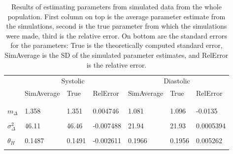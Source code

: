 \documentclass[
]{article}
\begin{document}
\begin{table}[!h]

\caption{\label{tab:testparameters}Results of estimating parameters from simulated data from the whole population. 
    First column on top is the average parameter estimate from the simulations, second is the true parameter from which the simulations were made, third is the relative error.
    On bottom are the standard errors for the parameters: True is the theoretically computed standard error, SimAverage is the SD of the simulated parameter estimates, and RelError is the relative error.}
\centering
\begin{tabular}[t]{lllllll}
\toprule
\multicolumn{1}{c}{ } & \multicolumn{3}{c}{Systolic} & \multicolumn{3}{c}{Diastolic} \\
\cmidrule(l{3pt}r{3pt}){2-4} \cmidrule(l{3pt}r{3pt}){5-7}
  & SimAverage & True & RelError & SimAverage & True & RelError\\
\midrule
\addlinespace[0.3em]
\multicolumn{7}{l}{\textbf{Parameter estimates}}\\
\cellcolor{gray!6}{\hspace{1em}$m_M$} & \cellcolor{gray!6}{123.4} & \cellcolor{gray!6}{123.3} & \cellcolor{gray!6}{0.0006065} & \cellcolor{gray!6}{72.34} & \cellcolor{gray!6}{72.31} & \cellcolor{gray!6}{0.0004937}\\
\hspace{1em}$m_\Delta$ & 1.358 & 1.351 & 0.004746 & 1.081 & 1.096 & -0.0135\\
\cellcolor{gray!6}{\hspace{1em}$\sigma^2_M$} & \cellcolor{gray!6}{376.1} & \cellcolor{gray!6}{376.7} & \cellcolor{gray!6}{-0.001494} & \cellcolor{gray!6}{104.1} & \cellcolor{gray!6}{104} & \cellcolor{gray!6}{0.00128}\\
\hspace{1em}$\sigma^2_\Delta$ & 46.11 & 46.46 & -0.007488 & 21.94 & 21.93 & 0.0005394\\
\cellcolor{gray!6}{\hspace{1em}$\alpha_H$} & \cellcolor{gray!6}{2.16} & \cellcolor{gray!6}{2.179} & \cellcolor{gray!6}{-0.008571} & \cellcolor{gray!6}{2.331} & \cellcolor{gray!6}{2.331} & \cellcolor{gray!6}{-4.281e-05}\\
\hspace{1em}$\theta_H$ & 0.1487 & 0.1491 & -0.002611 & 0.1966 & 0.1956 & 0.005262\\
\cellcolor{gray!6}{\hspace{1em}$\alpha_C$} & \cellcolor{gray!6}{2.545} & \cellcolor{gray!6}{2.565} & \cellcolor{gray!6}{-0.007827} & \cellcolor{gray!6}{2.728} & \cellcolor{gray!6}{2.763} & \cellcolor{gray!6}{-0.0129}\\

\end{tabular}
\end{table}
\end{document}
